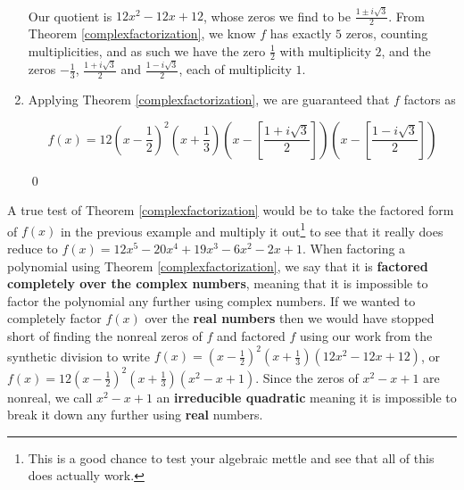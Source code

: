 \documentclass{ximera}
\begin{document}
\begin{ex}
\begin{enumerate}
\[\begin{array}{rrrrrrr}
\end{array}\]

Our quotient is $12x^2 - 12x + 12$, whose zeros we find to be $\frac{1 \pm i \sqrt{3}}{2}$.  From Theorem \ref{complexfactorization}, we know $f$ has exactly $5$ zeros, counting multiplicities, and as such we have the zero $\frac{1}{2}$ with multiplicity $2$, and the zeros $-\frac{1}{3}$, $\frac{1 + i \sqrt{3}}{2}$ and $\frac{1 - i \sqrt{3}}{2}$, each of multiplicity $1$.

\item  Applying Theorem \ref{complexfactorization}, we are guaranteed that $f$ factors as

\[f(x) = 12 \left(x- \dfrac{1}{2}\right)^2 \left(x + \dfrac{1}{3}\right) \left(x - \left[\dfrac{1 + i \sqrt{3}}{2}\right]\right) \left(x - \left[\dfrac{1 - i \sqrt{3}}{2}\right]\right)\]

\vspace{-.4in} \qed

\end{enumerate}

\end{ex}

A true test of Theorem \ref{complexfactorization} would be to take the factored form of $f(x)$ in the previous example and multiply it out\footnote{This is a good chance to test your algebraic mettle and see that all of this does actually work.} to see that it really does reduce to  $f(x) = 12x^5 - 20x^4+19x^3-6x^2-2x+1$.  When factoring a polynomial using Theorem \ref{complexfactorization}, we say that it is  \textbf{factored completely over the complex numbers}, meaning that it is impossible to factor the polynomial any further using complex numbers.  If we wanted to   completely factor $f(x)$ over the \textbf{real numbers} then we would have stopped short of finding the nonreal zeros of $f$ and factored $f$ using our work from the synthetic division to write $f(x) = \left(x - \frac{1}{2} \right)^2 \left(x + \frac{1}{3} \right)\left(12x^2 - 12x + 12\right)$, or $f(x) = 12\left(x - \frac{1}{2} \right)^2 \left(x + \frac{1}{3} \right)\left(x^2 - x + 1\right)$.  Since the zeros of $x^2-x+1$ are nonreal, we call $x^2-x+1$ an \textbf{irreducible quadratic} meaning it is impossible to break it down any further using \textbf{real} numbers.  
\end{document}
